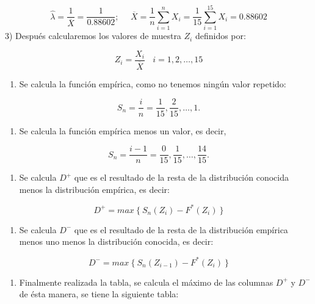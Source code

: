 \documentclass[
  a4paper,
  oneside,
  openany]{book}
\providecommand{\tightlist}{%
  \setlength{\itemsep}{0pt}\setlength{\parskip}{0pt}}
\begin{document}
\[\hat{\lambda}=\frac{1}{\overline{X}}=\frac{1}{0.88602}; \ \ \ \ \ \  \overline{X}=\frac{1}{n}\sum_{i=1}^{n}X_{i}=\frac{1}{15}\sum_{i=1}^{15}X_{i}=0.88602\]
3) Después calcularemos los valores de muestra \(Z_{i}\) definidos por:

\[Z_{i}=\frac{X_{i}}{\overline{X}} \ \ \ \ i=1,2,\ldots,15\]

\begin{enumerate}
\def\labelenumi{\arabic{enumi})}
\setcounter{enumi}{3}
\tightlist
\item
  Se calcula la función empírica, como no tenemos ningún valor repetido:
\end{enumerate}

\[S_{n}= \frac{i}{n}=\frac{1}{15},\frac{2}{15}, \ldots, 1. \]

\begin{enumerate}
\def\labelenumi{\arabic{enumi})}
\setcounter{enumi}{4}
\tightlist
\item
  Se calcula la función empírica menos un valor, es decir,
\end{enumerate}

\[S_{n}= \frac{i-1}{n}=\frac{0}{15},\frac{1}{15}, \ldots, \frac{14}{15}.\]

\begin{enumerate}
\def\labelenumi{\arabic{enumi})}
\setcounter{enumi}{5}
\tightlist
\item
  Se calcula \(D^+\) que es el resultado de la resta de la distribución conocida menos la distribución empírica, es decir:
\end{enumerate}

\[D^+= max \ \{ \ S_{n}(Z_{i})-F^*(Z_{i}) \ \}\]

\begin{enumerate}
\def\labelenumi{\arabic{enumi})}
\setcounter{enumi}{6}
\tightlist
\item
  Se calcula \(D^-\) que es el resultado de la resta de la distribución empírica menos uno menos la distribución conocida, es decir:
\end{enumerate}

\[D^-= max \  \{\ S_{n}(Z_{i-1})-F^*(Z_{i}) \ \}\]

\begin{enumerate}
\def\labelenumi{\arabic{enumi})}
\setcounter{enumi}{7}
\tightlist
\item
  Finalmente realizada la tabla, se calcula el máximo de las columnas \(D^+\) y \(D^-\) de ésta manera, se tiene la siguiente tabla:
\end{enumerate}
\end{document}
